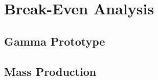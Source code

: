 

\setcounter{section}{1}
\section{Break-Even Analysis}

\subsection{Gamma Prototype}

\bigskip




















\pagebreak
\subsection{Mass Production}

\bigskip